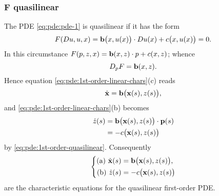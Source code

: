 \subsubsection[\(F\) quasilinear]{\(\boldsymbol F\)  quasilinear}
The PDE \eqref{eq:pde:pde-1} is quasilinear if it has the form
\begin{equation}
  \label{eq:pde:1st-order-quasilinear}
  F(Du,u,x)=\mathbf{b}\bigl(x,u(x)\bigr)\cdot Du(x)+c\bigl(x,u(x)\bigr)=0.
\end{equation}
In this circumstance \(F(p,z,x)=\mathbf{b}(x,z)\cdot p+c(x,z)\); whence
\[
  D_pF=\mathbf{b}(x,z).
\]
Hence equation \eqref{eq:pde:1st-order-linear-chars}(c) reads
\[
  \dot{\mathbf{x}}=\mathbf{b}\bigl( \mathbf{x}(s),z(s) \bigr),
\]
and \eqref{eq:pde:1st-order-linear-chars}(b) becomes
\begin{align*}
  \dot z(s)&=\mathbf{b}\bigl(\mathbf{x}(s),z(s)\bigr)\cdot\mathbf{p}(s)\\
           &=-c\bigl(\mathbf{x}(s),z(s)\bigr)
\end{align*}
by \eqref{eq:pde:1st-order-quasilinear}. Consequently
\begin{equation}
  \label{eq:pde:1st-order-quasilinear-chars}
  \left\{
    \begin{aligned}
      \text{(a) } \dot{\mathbf{x}}(s)&=\mathbf{b}\bigl( \mathbf{x}(s),z(s) \bigr),\\
      \text{(b) } \dot z(s)&=-c\bigl( \mathbf{x}(s),z(s) \bigr)
    \end{aligned}
  \right.
\end{equation}
are the characteristic equations for the quasilinear first-order PDE.


